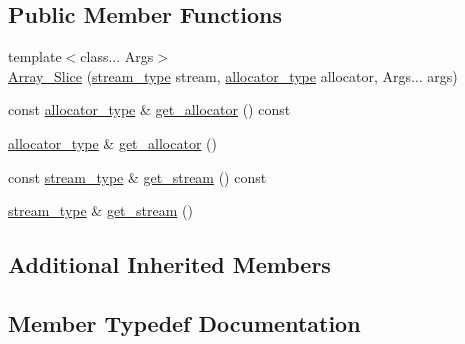 \subsection*{Public Member Functions}
\begin{DoxyCompactItemize}
\item 
{\footnotesize template$<$class... Args$>$ }\\\hyperlink{classbc_1_1tensors_1_1exprs_1_1Array__Slice_a3e7c54724b0e53e00ad3f4ece4ead243}{Array\+\_\+\+Slice} (\hyperlink{classbc_1_1tensors_1_1exprs_1_1Array__Slice_a73ab693dcce17b3bf37747b2e91a2fb2}{stream\+\_\+type} stream, \hyperlink{classbc_1_1tensors_1_1exprs_1_1Array__Slice_a54761123998b091676d1b0deef26d376}{allocator\+\_\+type} allocator, Args... args)
\item 
const \hyperlink{classbc_1_1tensors_1_1exprs_1_1Array__Slice_a54761123998b091676d1b0deef26d376}{allocator\+\_\+type} \& \hyperlink{classbc_1_1tensors_1_1exprs_1_1Array__Slice_ab520f10a439cba864b29a6a230533e91}{get\+\_\+allocator} () const
\item 
\hyperlink{classbc_1_1tensors_1_1exprs_1_1Array__Slice_a54761123998b091676d1b0deef26d376}{allocator\+\_\+type} \& \hyperlink{classbc_1_1tensors_1_1exprs_1_1Array__Slice_ac933425cbd4d31a5a717603af289fe70}{get\+\_\+allocator} ()
\item 
const \hyperlink{classbc_1_1tensors_1_1exprs_1_1Array__Slice_a73ab693dcce17b3bf37747b2e91a2fb2}{stream\+\_\+type} \& \hyperlink{classbc_1_1tensors_1_1exprs_1_1Array__Slice_a739a989a4218cc756e1cc60ea9560ecf}{get\+\_\+stream} () const
\item 
\hyperlink{classbc_1_1tensors_1_1exprs_1_1Array__Slice_a73ab693dcce17b3bf37747b2e91a2fb2}{stream\+\_\+type} \& \hyperlink{classbc_1_1tensors_1_1exprs_1_1Array__Slice_a9dda2d0d35e3dbee9d56883ace9256df}{get\+\_\+stream} ()
\end{DoxyCompactItemize}
\subsection*{Additional Inherited Members}


\subsection{Member Typedef Documentation}
\mbox{\label{classbc_1_1tensors_1_1exprs_1_1Array__Slice_a54761123998b091676d1b0deef26d376}} 

